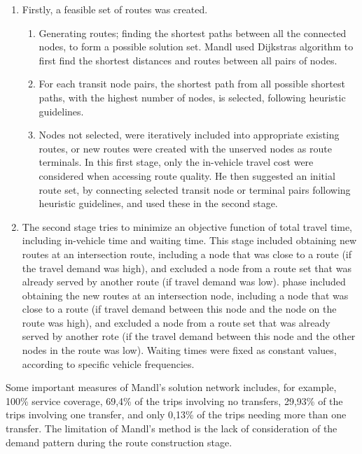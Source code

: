 \begin{enumerate}
\item Firstly, a feasible set of routes was created. 
\begin{enumerate}
\item Generating routes; finding the shortest paths between all the connected nodes, to form a possible solution set. Mandl used Dijkstras algorithm to first find the shortest distances and routes between all pairs of nodes.  
\item For each transit node pairs, the shortest path from all possible shortest paths, with the highest number of nodes, is selected, following heuristic guidelines. 
\item Nodes not selected, were iteratively included into appropriate existing routes, or new routes were created with the unserved nodes as route terminals. 
In this first stage, only the in-vehicle travel cost were considered when accessing route quality. He then suggested an initial route set, by connecting selected transit node or terminal pairs following heuristic guidelines, and used these in the second stage. 
\end{enumerate}
\item The second stage tries to minimize an objective function of total travel time, including in-vehicle time and waiting time. This stage included obtaining new routes at an intersection route, including a node that was close to a route (if the travel demand was high), and excluded a node from a route set that was already served by another route (if travel demand was low). phase included obtaining the new routes at an intersection node, including a node that was close to a route (if travel demand between this node and the node on the route was high), and excluded a node from a route set that was already served by another rote (if the travel demand between this node and the other nodes in the route was low). Waiting times were fixed as constant values, according to specific vehicle frequencies.  
\end{enumerate}

Some important measures of Mandl's solution network includes, for example, 100\% service coverage, 69,4\% of the trips involving no transfers, 29,93\% of the trips involving one transfer, and only 0,13\% of the trips needing more than one transfer. The limitation of Mandl's method is the lack of consideration of the demand pattern during the route construction stage.\citep{zhao03}


